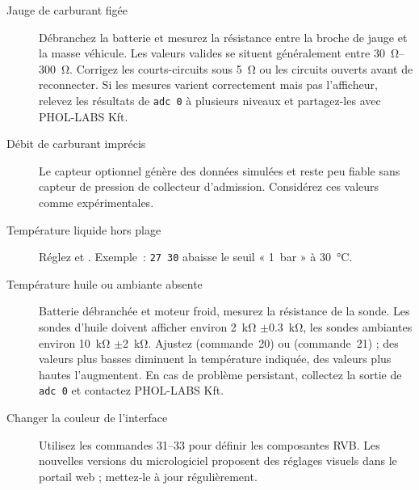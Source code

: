 \begin{description}
    \item[Jauge de carburant figée] Débranchez la batterie et mesurez la résistance entre la broche de jauge et la masse véhicule. Les valeurs valides se situent généralement entre \SIrange{30}{300}{\ohm}. Corrigez les courts-circuits sous \SI{5}{\ohm} ou les circuits ouverts avant de reconnecter. Si les mesures varient correctement mais pas l'afficheur, relevez les résultats de \verb|adc 0| à plusieurs niveaux et partagez-les avec PHOL-LABS Kft.
    \item[Débit de carburant imprécis] Le capteur optionnel génère des données simulées et reste peu fiable sans capteur de pression de collecteur d'admission. Considérez ces valeurs comme expérimentales.
    \item[Température liquide hors plage] Réglez  et . Exemple~: \verb|27 30| abaisse le seuil « 1~bar » à \SI{30}{\celsius}.
    \item[Température huile ou ambiante absente] Batterie débranchée et moteur froid, mesurez la résistance de la sonde. Les sondes d'huile doivent afficher environ \SI{2}{\kilo\ohm} \ensuremath{\pm}\SI{0.3}{\kilo\ohm}, les sondes ambiantes environ \SI{10}{\kilo\ohm} \ensuremath{\pm}\SI{2}{\kilo\ohm}. Ajustez  (commande~20) ou  (commande~21) ; des valeurs plus basses diminuent la température indiquée, des valeurs plus hautes l'augmentent. En cas de problème persistant, collectez la sortie de \verb|adc 0| et contactez PHOL-LABS Kft.
    \item[Changer la couleur de l'interface] Utilisez les commandes 31--33 pour définir les composantes RVB. Les nouvelles versions du micrologiciel proposent des réglages visuels dans le portail web ; mettez-le à jour régulièrement.
\end{description}
